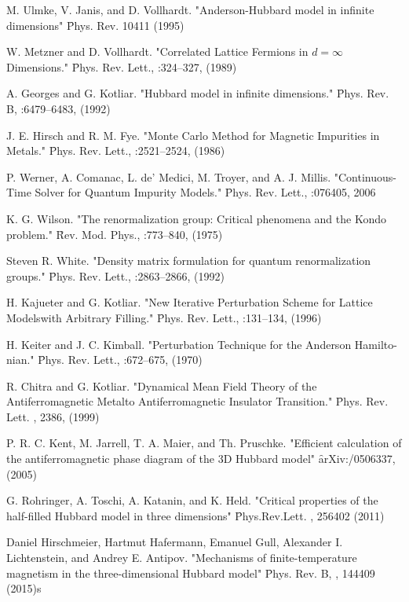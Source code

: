 \begin{thebibliography}{4}
{ M. Ulmke, V. Janis, and D. Vollhardt. "Anderson-Hubbard model in infinite dimensions" \f{Phys. Rev}.  10411 (1995) }

{ W. Metzner and D. Vollhardt. "Correlated Lattice Fermions in $d = \infty$ Dimensions." \f{Phys. Rev. Lett.}, :324–327, (1989) }

{ A. Georges and G. Kotliar. "Hubbard model in infinite dimensions." \f{Phys. Rev. B}, :6479–6483, (1992) }

{ J. E. Hirsch and R. M. Fye.  "Monte Carlo Method for Magnetic Impurities in Metals." \f{Phys. Rev. Lett.}, :2521–2524, (1986) }

{ P. Werner, A. Comanac, L. de’ Medici, M. Troyer, and A. J. Millis. "Continuous-Time Solver for Quantum Impurity Models." \f{Phys. Rev. Lett.}, :076405, {2006} }

{ K. G. Wilson. "The renormalization group: Critical phenomena and the Kondo problem." \f{Rev. Mod. Phys.}, :773–840, (1975) }

{  Steven R. White. "Density matrix formulation for quantum renormalization groups." \f{Phys. Rev. Lett.}, :2863–2866, (1992) }

{ H. Kajueter and G. Kotliar. "New Iterative Perturbation Scheme for Lattice Modelswith Arbitrary Filling." \f{Phys. Rev. Lett.}, :131–134, (1996) }

{ H. Keiter and J. C. Kimball. "Perturbation Technique for the Anderson Hamilto-nian." \f{Phys. Rev. Lett.}, :672–675, (1970) }

{ R. Chitra and G. Kotliar. "Dynamical Mean Field Theory of the Antiferromagnetic Metalto Antiferromagnetic Insulator Transition." \f{Phys. Rev. Lett.} , 2386, (1999) }

{ P. R. C. Kent, M. Jarrell, T. A. Maier, and Th. Pruschke. "Efficient calculation of the antiferromagnetic phase diagram of the 3D Hubbard model" \f{arXiv:}/0506337, (2005) }

{G. Rohringer, A. Toschi, A. Katanin, and K. Held. "Critical properties of the half-filled Hubbard model in three dimensions" \f{Phys.Rev.Lett.} , 256402 (2011) }

{ Daniel Hirschmeier, Hartmut Hafermann, Emanuel Gull, Alexander I. Lichtenstein, and Andrey E. Antipov. "Mechanisms of finite-temperature magnetism in the three-dimensional Hubbard model" \f{Phys. Rev. B}, , 144409 (2015)s }


\end{thebibliography}
